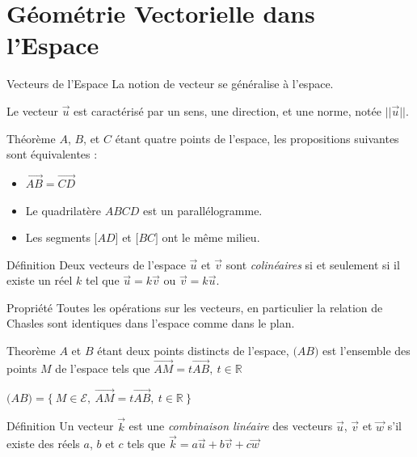 \documentclass{coursbook}
\begin{document}
    \chapter{Géométrie Vectorielle dans l'Espace}

    \begin{Gpartie}{Vecteurs de l'Espace} 
        La notion de vecteur se généralise à l'espace.

        Le vecteur $\vec{u}$ est caractérisé par un sens, une direction, et une norme, notée $\lvert\lvert{\vec{u}}\rvert\rvert$.
        \begin{Spartie}{Théorème} 
            $A$, $B$, et $C$ étant quatre points de l'espace, les propositions suivantes sont équivalentes :
            \begin{itemize}
                \item $\overrightarrow{AB}=\overrightarrow{CD}$
                \item Le quadrilatère $ABCD$ est un parallélogramme.
                \item Les segments $\big[AD\big]$ et $\big[BC\big]$ ont le même milieu.
            \end{itemize}
        \end{Spartie}
        \begin{Spartie}{Définition} 
            Deux vecteurs de l'espace $\vec{u}$ et $\vec{v}$ sont \emph{colinéaires} si et seulement si il existe un réel $k$ tel que $\vec{u}=k\vec{v}$ ou $\vec{v}=k\vec{u}$.
        \end{Spartie}
        \begin{Spartie}{Propriété} 
            Toutes les opérations sur les vecteurs, en particulier la relation de Chasles sont identiques dans l'espace comme dans le plan.
        \end{Spartie}
        \begin{Spartie}{Theorème} 
            $A$ et $B$ étant deux points distincts de l'espace, $\big(AB\big)$ est l'ensemble des points $M$ de l'espace tels que $\overrightarrow{AM}=t \overrightarrow{AB},\ t\in\mathbb{R}$

            $\big(AB\big)=\big\{~M\in\mathcal{E},~\overrightarrow{AM}=t\overrightarrow{AB},~t\in\mathbb{R}~\big\}$
        \end{Spartie}
        \begin{Spartie}{Définition} 
            Un vecteur $\vec{k}$ est une \emph{combinaison linéaire} des vecteurs $\vec{u}$, $\vec{v}$ et $\vec{w}$ s'il existe des réels $a$, $b$ et $c$ tels que $\vec{k}=a\vec{u}+b\vec{v}+c\vec{w}$
        \end{Spartie}
    \end{Gpartie}
\end{document}
